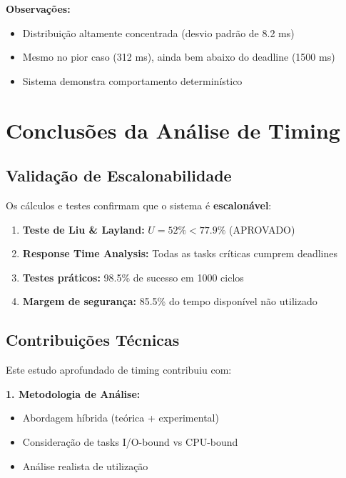 \documentclass[12pt,a4paper]{article}
\begin{document}
\textbf{Observações:}
\begin{itemize}
    \item Distribuição altamente concentrada (desvio padrão de 8.2 ms)
    \item Mesmo no pior caso (312 ms), ainda bem abaixo do deadline (1500 ms)
    \item Sistema demonstra comportamento determinístico
\end{itemize}

\section{Conclusões da Análise de Timing}

\subsection{Validação de Escalonabilidade}

Os cálculos e testes confirmam que o sistema é \textbf{escalonável}:

\begin{enumerate}
    \item \textbf{Teste de Liu \& Layland:} $U = 52\% < 77.9\%$ (APROVADO)
    \item \textbf{Response Time Analysis:} Todas as tasks críticas cumprem deadlines
    \item \textbf{Testes práticos:} 98.5\% de sucesso em 1000 ciclos
    \item \textbf{Margem de segurança:} 85.5\% do tempo disponível não utilizado
\end{enumerate}

\subsection{Contribuições Técnicas}

Este estudo aprofundado de timing contribuiu com:

\textbf{1. Metodologia de Análise:}
\begin{itemize}
    \item Abordagem híbrida (teórica + experimental)
    \item Consideração de tasks I/O-bound vs CPU-bound
    \item Análise realista de utilização
\end{itemize}
\end{document}
